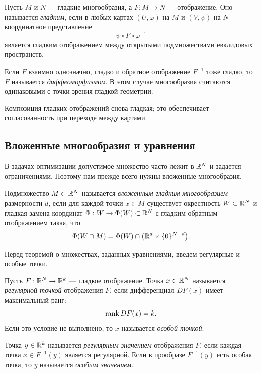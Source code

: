 \begin{definition}
Пусть $M$ и $N$ --- гладкие многообразия, а $F:M\to N$ --- отображение. Оно называется \textit{гладким}, если в любых картах $(U,\varphi)$ на $M$ и $(V,\psi)$ на $N$ координатное представление
\[
\psi\circ F\circ\varphi^{-1}
\]
является гладким отображением между открытыми подмножествами евклидовых пространств.
\end{definition}

Если $F$ взаимно однозначно, гладко и обратное отображение $F^{-1}$ тоже гладко, то $F$ называется \textit{диффеоморфизмом}. В этом случае многообразия считаются одинаковыми с точки зрения гладкой геометрии.

Композиция гладких отображений снова гладкая; это обеспечивает согласованность при переходе между картами.

\subsection{Вложенные многообразия и уравнения}

В задачах оптимизации допустимое множество часто лежит в $\mathbb{R}^N$ и задается ограничениями. Поэтому нам прежде всего нужны вложенные многообразия.

\begin{definition}
Подмножество $M\subset\mathbb{R}^N$ называется \textit{вложенным гладким многообразием} размерности $d$, если для каждой точки $x\in M$ существует окрестность $W\subset\mathbb{R}^N$ и гладкая замена координат $\Phi:W\to\Phi(W)\subset\mathbb{R}^N$ с гладким обратным отображением такая, что
\[
\Phi(W\cap M)=\Phi(W)\cap\bigl(\mathbb{R}^d\times\{0\}^{N-d}\bigr).
\]
\end{definition}

Перед теоремой о множествах, заданных уравнениями, введем регулярные и особые точки.

\begin{definition}
Пусть $F:\mathbb{R}^N\to\mathbb{R}^k$ --- гладкое отображение. Точка $x\in\mathbb{R}^N$ называется \textit{регулярной точкой} отображения $F$, если дифференциал $DF(x)$ имеет максимальный ранг:
\[
\operatorname{rank} DF(x)=k.
\]
Если это условие не выполнено, то $x$ называется \textit{особой точкой}.
\end{definition}

\begin{definition}
Точка $y\in\mathbb{R}^k$ называется \textit{регулярным значением} отображения $F$, если каждая точка $x\in F^{-1}(y)$ является регулярной. Если в прообразе $F^{-1}(y)$ есть особая точка, то $y$ называется \textit{особым значением}.
\end{definition}

